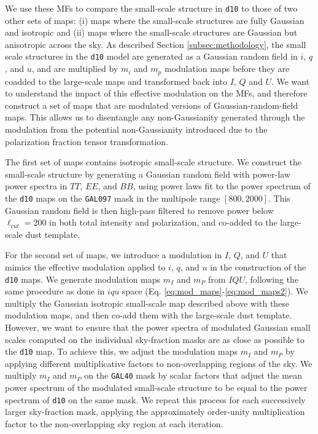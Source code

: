\documentclass[twocolumn]{aastex631}
\begin{document}
We use these MFs to compare the small-scale structure in \texttt{d10} to those of two other sets of maps: (i) maps where the small-scale structures are fully Gaussian and isotropic and (ii) maps where the small-scale structures are Gaussian but anisotropic across the sky. As described Section \ref{subsec:methodology}, the small scale structures in the \texttt{d10} model are generated as a Gaussian random field in $i$, $q$, and $u$, and are multiplied by $m_i$ and $m_p$ modulation maps before they are coadded to the large-scale maps and transformed back into $I$, $Q$ and $U$. %
We want to understand the impact of this effective modulation on the MFs, and therefore construct a set of maps that are modulated versions of Gaussian-random-field maps. 
This allows us to disentangle any non-Gaussianity generated through the modulation from the potential non-Gaussianity introduced due to the polarization fraction tensor transformation.

The first set of maps contains isotropic small-scale structure. We construct the small-scale structure by generating a Gaussian random field with power-law power spectra in $TT$, $EE$, and $BB$, using power laws fit to the power spectrum of the \texttt{d10} maps on the \texttt{GAL097} mask in the multipole range $[800, 2000]$. This Gaussian random field is then high-pass filtered to remove power below $\ell_{cut} = 200$ in both total intensity and polarization, and co-added to the large-scale dust template.

For the second set of maps, we introduce a modulation in $I$, $Q$, and $U$ that mimics the effective modulation applied to $i$, $q$, and $u$ in the construction of the \texttt{d10} maps. We generate modulation maps $m_I$ and $m_P$ from $IQU$, following the same procedure as done in $iqu$ space (Eq. \ref{eq:mod_maps}-\ref{eq:mod_maps2}). We multiply the Gaussian isotropic small-scale map described above with these modulation maps, and then co-add them with the large-scale dust template. However, we want to ensure that the power spectra of modulated Gaussian small scales computed on the individual sky-fraction masks are as close as possible to the \texttt{d10} map. To achieve this, we adjust the modulation maps $m_I$ and $m_P$ by applying different multiplicative factors to non-overlapping regions of the sky. We multiply $m_I$ and $m_P$ on the \texttt{GAL40} mask by scalar factors that adjust the mean power spectrum of the modulated small-scale structure to be equal to the power spectrum of \texttt{d10} on the same mask. We repeat this process for each successively larger sky-fraction mask, applying the approximately order-unity multiplication factor to the non-overlapping sky region at each iteration. 
\end{document}
